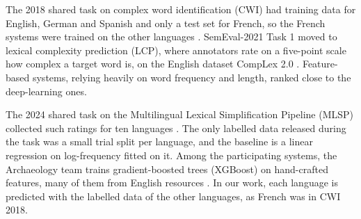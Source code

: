 The 2018 shared task on complex word identification (CWI) had training data for English, German %
and Spanish and only a test set for French, so the French systems were trained on the other %
languages \citep{yimam-etal-2018-report}. SemEval-2021 Task 1 moved to lexical complexity %
prediction (LCP), where annotators rate on a five-point scale how complex a target word is, on the
English dataset CompLex 2.0 \citep{shardlow-etal-2021-semeval}. Feature-based systems, relying %
heavily on word frequency and length, ranked close to the deep-learning ones.

The 2024 shared task on the Multilingual Lexical Simplification Pipeline (MLSP) collected such %
ratings for ten languages \citep{shardlow-etal-2024-bea}. The only labelled data released during %
the task was a small trial split per language, and the baseline is a linear regression on %
log-frequency fitted on it. Among the participating systems, the Archaeology team trains %
gradient-boosted trees (XGBoost) on hand-crafted features, many of them from English resources
\citep{cristea-nisioi-2024-machine}. In our work, each language is predicted with the labelled
data of the other languages, as French was in CWI 2018.

